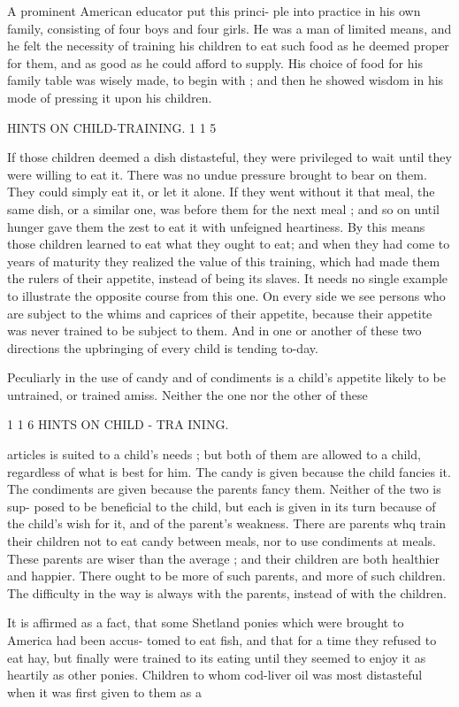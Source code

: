 \documentclass[
]{book}
\begin{document}
A prominent American educator put this princi- ple into practice in his own family, consisting of four boys and four girls. He was a man of limited means, and he felt the necessity of training his children to eat such food as he deemed proper for them, and as good as he could afford to supply. His choice of food for his family table was wisely made, to begin with ; and then he showed wisdom in his mode of pressing it upon his children.

HINTS ON CHILD-TRAINING. 1 1 5

If those children deemed a dish distasteful, they were privileged to wait until they were willing to eat it. There was no undue pressure brought to bear on them. They could simply eat it, or let it alone. If they went without it that meal, the same dish, or a similar one, was before them for the next meal ; and so on until hunger gave them the zest to eat it with unfeigned heartiness. By this means those children learned to eat what they ought to eat; and when they had come to years of maturity they realized the value of this training, which had made them the rulers of their appetite, instead of being its slaves. It needs no single example to illustrate the opposite course from this one. On every side we see persons who are subject to the whims and caprices of their appetite, because their appetite was never trained to be subject to them. And in one or another of these two directions the upbringing of every child is tending to-day.

Peculiarly in the use of candy and of condiments is a child's appetite likely to be untrained, or trained amiss. Neither the one nor the other of these

1 1 6 HINTS ON CHILD - TRA INING.

articles is suited to a child's needs ; but both of them are allowed to a child, regardless of what is best for him. The candy is given because the child fancies it. The condiments are given because the parents fancy them. Neither of the two is sup- posed to be beneficial to the child, but each is given in its turn because of the child's wish for it, and of the parent's weakness. There are parents whq train their children not to eat candy between meals, nor to use condiments at meals. These parents are wiser than the average ; and their children are both healthier and happier. There ought to be more of such parents, and more of such children. The difficulty in the way is always with the parents, instead of with the children.

It is affirmed as a fact, that some Shetland ponies which were brought to America had been accus- tomed to eat fish, and that for a time they refused to eat hay, but finally were trained to its eating until they seemed to enjoy it as heartily as other ponies. Children to whom cod-liver oil was most distasteful when it was first given to them as a
\end{document}
